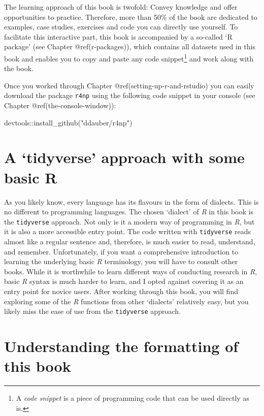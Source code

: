 \documentclass[
  letterpaper,
]{krantz}
\makeatletter
\newenvironment{Shaded}{\begin{snugshade}}{\end{snugshade}}
\newcommand{\FunctionTok}[1]{\textcolor[rgb]{0.28,0.35,0.67}{#1}}
\newcommand{\NormalTok}[1]{\textcolor[rgb]{0.00,0.23,0.31}{#1}}
\newcommand{\SpecialCharTok}[1]{\textcolor[rgb]{0.37,0.37,0.37}{#1}}
\newcommand{\StringTok}[1]{\textcolor[rgb]{0.13,0.47,0.30}{#1}}
\newenvironment{kframe}{%
\medskip{}
\setlength{\fboxsep}{.8em}
 \def\at@end@of@kframe{}%
 \ifinner\ifhmode%
  \def\at@end@of@kframe{\end{minipage}}%
  \begin{minipage}{\columnwidth}%
 \fi\fi%
 \def\FrameCommand##1{\hskip\@totalleftmargin \hskip-\fboxsep
 \colorbox{shadecolor}{##1}\hskip-\fboxsep
     \hskip-\linewidth \hskip-\@totalleftmargin \hskip\columnwidth}%
 \MakeFramed {\advance\hsize-\width
   \@totalleftmargin\z@ \linewidth\hsize
   \@setminipage}}%
 {\par\unskip\endMakeFramed%
 \at@end@of@kframe}
\renewenvironment{Shaded}{\begin{kframe}}{\end{kframe}}
\makeatother
\begin{document}
The learning approach of this book is twofold: Convey knowledge and
offer opportunities to practice. Therefore, more than 50\% of the book
are dedicated to examples, case studies, exercises and code you can
directly use yourself. To facilitate this interactive part, this book is
accompanied by a so-called `R package' (see Chapter @ref(r-packages)),
which contains all datasets used in this book and enables you to copy
and paste any code snippet\footnote{A \emph{code snippet} is a piece of
  programming code that can be used directly as is.} and work along with
the book.

Once you worked through Chapter @ref(setting-up-r-and-rstudio) you can
easily download the package \texttt{r4np} using the following code
snippet in your console (see Chapter @ref(the-console-window)):

\begin{Shaded}
\begin{Highlighting}[]
\NormalTok{devtools}\SpecialCharTok{::}\FunctionTok{install\_github}\NormalTok{(}\StringTok{"ddauber/r4np"}\NormalTok{)}
\end{Highlighting}
\end{Shaded}

\section{A `tidyverse' approach with some basic
R}\label{sec-a-tidyverse-approach-with-some-basic-r}

As you likely know, every language has its flavours in the form of
dialects. This is no different to programming languages. The chosen
`dialect' of \emph{R} in this book is the \texttt{tidyverse} approach.
Not only is it a modern way of programming in \emph{R}, but it is also a
more accessible entry point. The code written with \texttt{tidyverse}
reads almost like a regular sentence and, therefore, is much easier to
read, understand, and remember. Unfortunately, if you want a
comprehensive introduction to learning the underlying basic \emph{R}
terminology, you will have to consult other books. While it is
worthwhile to learn different ways of conducting research in \emph{R},
basic \emph{R} syntax is much harder to learn, and I opted against
covering it as an entry point for novice users. After working through
this book, you will find exploring some of the \emph{R} functions from
other `dialects' relatively easy, but you likely miss the ease of use
from the \texttt{tidyverse} approach.

\section{Understanding the formatting of this
book}\label{sec-formatting-of-this-book}
\end{document}
